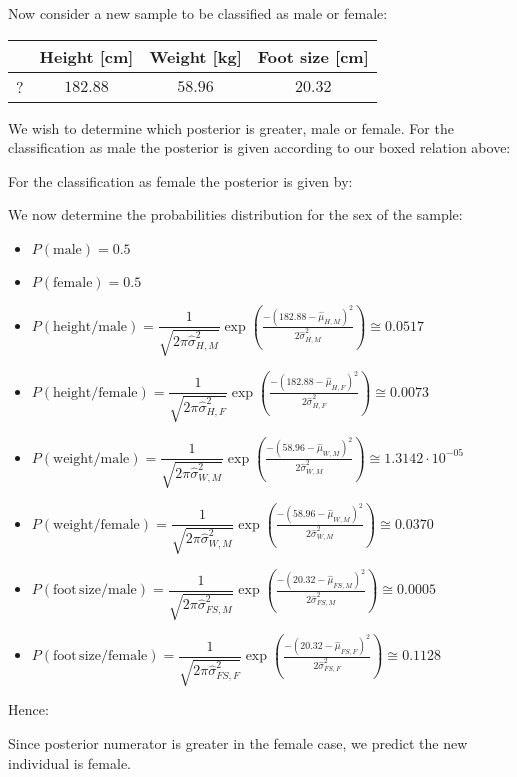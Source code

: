 \begin{tcolorbox}[colframe=black,colback=white,sharp corners]
	Now consider a new sample to be classified as male or female:
	\begin{table}[H]
		\centering
		\begin{tabular}{|c|c|c|c|}
		\hline
		\rowcolor[HTML]{9B9B9B} 
		\multicolumn{1}{|l|}{\cellcolor[HTML]{9B9B9B}\textbf{Person}} & \multicolumn{1}{l|}{\cellcolor[HTML]{9B9B9B}\textbf{Height [cm]}} & \multicolumn{1}{l|}{\cellcolor[HTML]{9B9B9B}\textbf{Weight [kg]}} & \multicolumn{1}{l|}{\cellcolor[HTML]{9B9B9B}\textbf{Foot size [cm]}} \\ \hline
		? & $182.88$ & $58.96$ & $20.32$ \\ \hline
		\end{tabular}
	\end{table}
	We wish to determine which posterior is greater, male or female. For the classification as male the posterior is given according to our boxed relation above:
	
	For the classification as female the posterior is given by:
	
	\end{tcolorbox}
	
	\begin{tcolorbox}[colframe=black,colback=white,sharp corners]
	 We now determine the probabilities distribution for the sex of the sample:
	 \begin{itemize}
	 	\item $P(\mathrm{male})=0.5$
	 	\item $P(\mathrm{female})=0.5$
	 	\item $P(\mathrm{height}/ {\mathrm{male}})={\dfrac {1}{\sqrt {2\pi \hat{\sigma}_{H,M}^{2}}}}\exp \left({\frac {-(182.88-\hat{\mu}_{H,M} )^{2}}{2 \hat{\sigma}^{2}_{H,M}}}\right)\cong 0.0517$
	 	\item $P(\mathrm{height}/ {\mathrm{female}})={\dfrac {1}{\sqrt {2\pi \hat{\sigma}_{H,F}^{2}}}}\exp \left({\frac {-(182.88-\hat{\mu}_{H,F} )^{2}}{2 \hat{\sigma}^{2}_{H,F}}}\right)\cong 0.0073$
	 	\item $P(\mathrm{weight}/ {\mathrm{male}})={\dfrac {1}{\sqrt {2\pi \hat{\sigma}_{W,M}^{2}}}}\exp \left({\frac {-(58.96-\hat{\mu}_{W,M} )^{2}}{2 \hat{\sigma}^{2}_{W,M}}}\right)\cong 1.3142\cdot 10^{-05}$
		\item $P(\mathrm{weight}/ {\mathrm{female}})={\dfrac {1}{\sqrt {2\pi \hat{\sigma}_{W,M}^{2}}}}\exp \left({\frac {-(58.96-\hat{\mu}_{W,M} )^{2}}{2 \hat{\sigma}^{2}_{W,M}}}\right)\cong 0.0370$
		\item $P(\mathrm{foot\,size}/ {\mathrm{male}})={\dfrac {1}{\sqrt {2\pi \hat{\sigma}_{FS,M}^{2}}}}\exp \left({\frac {-(20.32-\hat{\mu}_{FS,M} )^{2}}{2 \hat{\sigma}^{2}_{FS,M}}}\right)\cong 0.0005$
		\item $P(\mathrm{foot\,size}/ {\mathrm{female}})={\dfrac {1}{\sqrt {2\pi \hat{\sigma}_{FS,F}^{2}}}}\exp \left({\frac {-(20.32-\hat{\mu}_{FS,F} )^{2}}{2 \hat{\sigma}^{2}_{FS,F}}}\right)\cong 0.1128$
	 \end{itemize}
	 Hence:
	 
	Since posterior numerator is greater in the female case, we predict the new individual is female.
	\end{tcolorbox}
	
